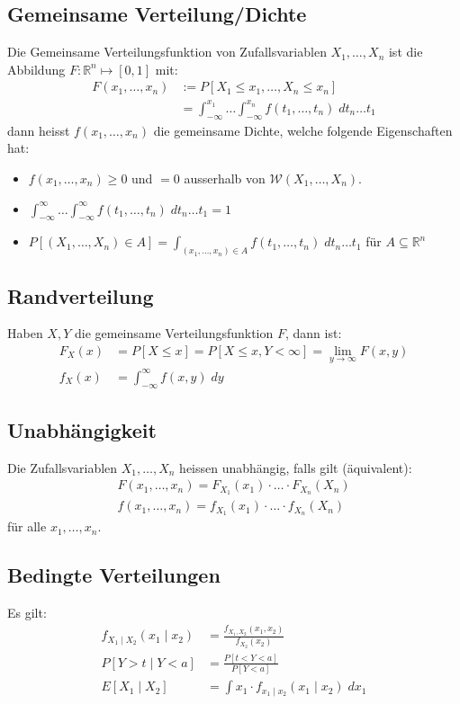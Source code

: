 \documentclass[8pt]{extarticle}
\newcommand{\R}{\mathbb{R}}
\newcommand{\W}{\mathcal{W}}
\newcommand{\ra}{\rightarrow}
\newcommand{\cond}[2]{P[#1 \; | \; #2]}
\newcommand{\zufallsvariablen}{X_1, \dots, X_n}
\begin{document}
\begin{multicols*}{3}
  \subsection*{Gemeinsame Verteilung/Dichte}
  Die Gemeinsame Verteilungsfunktion von Zufallsvariablen
  $\zufallsvariablen$ ist die Abbildung $F: \R^n \mapsto [0, 1]$ mit:
  \begin{align*}
    F(x_1, \dots, x_n) & := P[X_1 \leq x_1, \dots, X_n \leq x_n]                                                \\
                       & = \int_{-\infty}^{x_1} \dots \int_{-\infty}^{x_n} f(t_1, \dots, t_n) \; dt_n \dots t_1
  \end{align*}
  dann heisst $f(x_1, \dots, x_n)$ die gemeinsame Dichte, welche folgende
  Eigenschaften hat:
  \begin{itemize}
    \item $f(x_1, \dots, x_n) \geq 0$ und $= 0$ ausserhalb von $\W(\zufallsvariablen)$.
    \item $\int_{-\infty}^\infty \dots \int_{-\infty}^\infty f(t_1, \dots, t_n) \; dt_n \dots t_1 = 1$
    \item $P[(\zufallsvariablen) \in A] = \int_{(x_1, \dots, x_n) \in A} f(t_1, \dots, t_n) \; dt_n \dots t_1$ für $A \subseteq \R^n$
  \end{itemize}
  \subsection*{Randverteilung}
  Haben $X, Y$ die gemeinsame Verteilungsfunktion $F$,
  dann ist:
  \begin{align*}
    F_X(x) & = P[X \leq x] = P[X \leq x, Y < \infty] = \lim_{y \ra \infty} F(x, y) \\
    f_X(x) & = \int_{-\infty}^\infty f(x, y) \; dy
  \end{align*}
  \subsection*{Unabhängigkeit}
  Die Zufallsvariablen $\zufallsvariablen$ heissen unabhängig,
  falls gilt (äquivalent):
  \begin{align*}
    F(x_1, \dots, x_n) = F_{X_1}(x_1) \cdot \hdots \cdot F_{X_n}(X_n) \\
    f(x_1, \dots, x_n) = f_{X_1}(x_1) \cdot \hdots \cdot f_{X_n}(X_n)
  \end{align*}
  für alle $x_1, \dots, x_n$.
  \subsection*{Bedingte Verteilungen}
  Es gilt:
  \begin{align*}
    f_{X_1 \; | \; X_2}(x_1 \; | \; x_2) & = \frac{f_{X_1,  X_2}(x_1,  x_2)}{f_{X_2}(x_2)}               \\
    \cond{Y > t}{Y < a}                  & = \frac{P[t < Y < a]}{P[Y < a]}                               \\
    E[X_1 \; | \; X_2]                   & = \int x_1 \cdot f_{x_1 \; | \; x_2}(x_1 \; | \; x_2) \; dx_1
  \end{align*}

\end{multicols*}
\end{document}

